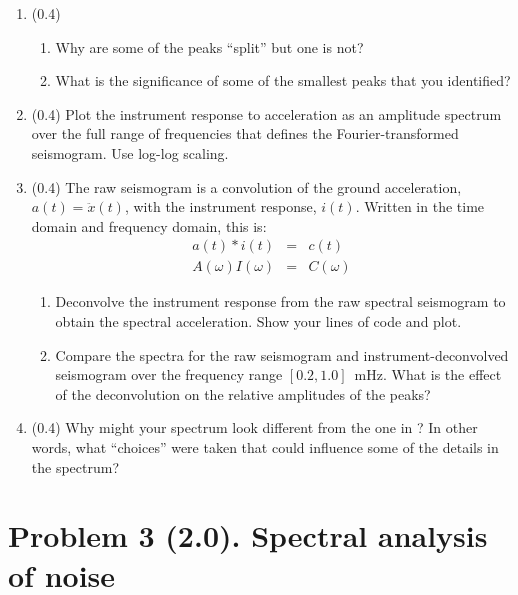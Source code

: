 \documentclass[11pt,titlepage,fleqn]{article}
\begin{document}
\begin{enumerate}
\item (0.4)

\begin{enumerate}
\item Why are some of the peaks ``split'' but one is not?
\item What is the significance of some of the smallest peaks that you identified?
\end{enumerate}


\item (0.4) Plot the instrument response to acceleration as an amplitude spectrum over the full range of frequencies that defines the Fourier-transformed seismogram. Use log-log scaling.


\item (0.4) The raw seismogram is a convolution of the ground acceleration, $a(t) = \ddot{x}(t)$, with the instrument response, $i(t)$. Written in the time domain and frequency domain, this is:
%
\begin{eqnarray}
a(t) * i(t) &=& c(t)
\\
A(\omega) I(\omega) &=& C(\omega)
\end{eqnarray}

\begin{enumerate}
\item Deconvolve the instrument response from the raw spectral seismogram to obtain the spectral acceleration. Show your lines of code and plot.
\item Compare the spectra for the raw seismogram and instrument-deconvolved seismogram over the frequency range $[0.2,1.0]$~mHz. What is the effect of the deconvolution on the relative amplitudes of the peaks?
\end{enumerate}


\item (0.4) Why might your spectrum look different from the one in \citet{Park2005}? In other words, what ``choices'' were taken that could influence some of the details in the spectrum?

\end{enumerate}


\pagebreak
\section*{Problem 3 (2.0). Spectral analysis of noise}
\end{document}
